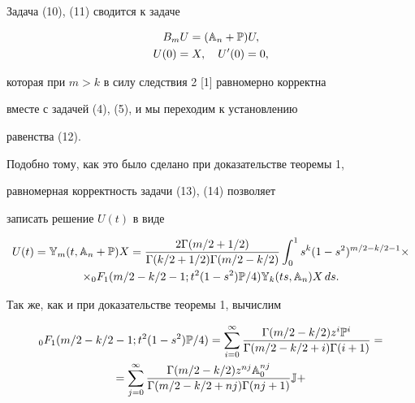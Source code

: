  


\begin{pf} Задача (10), (11) сводится к задаче 


\begin{gather} 


B_m U=(\Bbb A_n+\Bbb P)U, \\ 


U(0)=X,\quad U'(0)=0, 


\end{gather} 


которая при $m>k$ в силу следствия 2 [1] равномерно корректна 


вместе с задачей (4), (5), и мы переходим к установлению  


равенства (12). 


 


Подобно тому, как это было сделано при доказательстве теоремы 1, 


равномерная корректность задачи (13), (14) позволяет  


записать решение $U(t)$ в виде 


\begin{multline} 


U(t)=\Bbb Y_m(t,\Bbb A_n+\Bbb P)X= 


\frac{2\Gamma(m/2+1/2)} 


{\Gamma(k/2+1/2)\Gamma(m/2-k/2)}\int^1_0 


s^k(1-s^2)^{m/2-k/2-1}\times \\ 


\times {}_0F_1(m/2-k/2-1;t^2(1-s^2)\Bbb P/4) 


\Bbb Y_k(ts,\Bbb A_n)X\,ds. 


\end{multline} 


 


Так же, как и при доказательстве теоремы 1, вычислим 


\begin{multline} 


{}_0F_1(m/2-k/2-1;t^2(1-s^2)\Bbb P/4)= 


\sum^\infty_{i=0}\frac{\Gamma(m/2-k/2)z^i\Bbb P^i} 


{\Gamma(m/2-k/2+i)\Gamma(i+1)} = \\ 


% 


=\sum^\infty_{j=0}\frac{\Gamma(m/2-k/2)z^{nj}\Bbb A^{nj}_0} 


{\Gamma(m/2-k/2+nj)\Gamma(nj+1)}\Bbb J+ 



\end{multline}
\end{pf}

